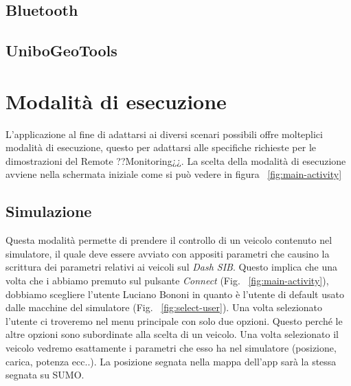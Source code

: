 \subsection{Bluetooth}

\subsection{UniboGeoTools}

\section{Modalità di esecuzione}

L'applicazione al fine di adattarsi ai diversi scenari possibili offre molteplici modalità di esecuzione, questo per adattarsi alle specifiche richieste per le dimostrazioni del Remote ??Monitoring¿¿. La scelta della modalità di esecuzione avviene nella schermata iniziale come si può vedere in figura ~\ref{fig:main-activity}

\subsection{Simulazione}
Questa modalità permette di prendere il controllo di un veicolo contenuto nel simulatore, il quale deve essere avviato con appositi parametri che causino la scrittura dei parametri relativi ai veicoli sul \emph{Dash SIB}. Questo implica che una volta che i abbiamo premuto sul pulsante \emph{Connect} (Fig. ~\ref{fig:main-activity}), dobbiamo scegliere l'utente Luciano Bononi in quanto è l'utente di default usato dalle macchine del simulatore (Fig. ~\ref{fig:select-user}). Una volta selezionato l'utente ci troveremo nel menu principale con solo due opzioni. Questo perché le altre opzioni sono subordinate alla scelta di un veicolo. Una volta selezionato il veicolo vedremo esattamente i parametri che esso ha nel simulatore (posizione, carica, potenza ecc..). La posizione segnata nella mappa dell'app sarà la stessa segnata su SUMO.


